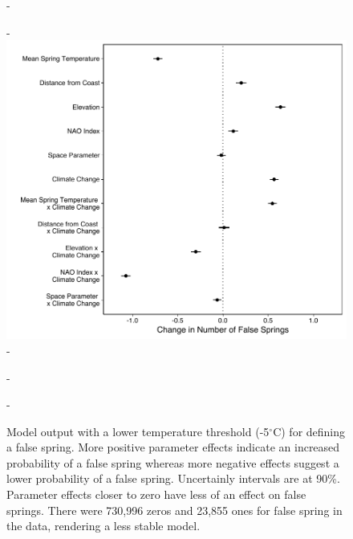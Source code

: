 \documentclass{article}\usepackage[]{graphicx}\usepackage[]{color}
\begin{document}
{\begin{figure} [H]
  -\begin{center}
  -\includegraphics[width=12cm]{..//figures/model_output_five_90.pdf}
  -\caption{Model output with a lower temperature threshold (-5$^{\circ}$C) for defining a false spring. More positive parameter effects indicate an increased probability of a false spring whereas more negative effects suggest a lower probability of a false spring. Uncertainly intervals are at 90\%. Parameter effects closer to zero have less of an effect on false springs. There were 730,996 zeros and 23,855 ones for false spring in the data, rendering a less stable model. }\label{fig:five}
  -\end{center}
  -\end{figure}}
  

\end{document}
